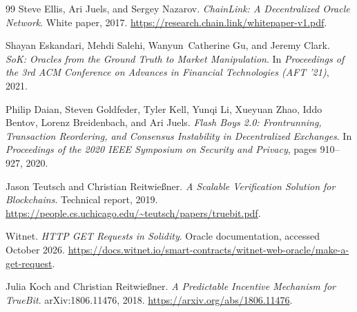 \documentclass[10pt]{article}
\begin{document}
\begin{thebibliography}{99}
Steve Ellis, Ari Juels, and Sergey Nazarov.
\newblock \emph{ChainLink: A Decentralized Oracle Network}.
\newblock White paper, 2017.
\newblock \url{https://research.chain.link/whitepaper-v1.pdf}.

Shayan Eskandari, Mehdi Salehi, Wanyun~Catherine Gu, and Jeremy Clark.
\newblock \emph{SoK: Oracles from the Ground Truth to Market Manipulation}.
\newblock In \emph{Proceedings of the 3rd ACM Conference on Advances in Financial Technologies (AFT '21)}, 2021.

Philip Daian, Steven Goldfeder, Tyler Kell, Yunqi Li, Xueyuan Zhao, Iddo Bentov, Lorenz Breidenbach, and Ari Juels.
\newblock \emph{Flash Boys 2.0: Frontrunning, Transaction Reordering, and Consensus Instability in Decentralized Exchanges}.
\newblock In \emph{Proceedings of the 2020 IEEE Symposium on Security and Privacy}, pages 910--927, 2020.

Jason Teutsch and Christian Reitwie{\ss}ner.
\newblock \emph{A Scalable Verification Solution for Blockchains}.
\newblock Technical report, 2019.
\newblock \url{https://people.cs.uchicago.edu/~teutsch/papers/truebit.pdf}.

Witnet.
\newblock \emph{HTTP GET Requests in Solidity}.
\newblock Oracle documentation, accessed October 2026.
\newblock \url{https://docs.witnet.io/smart-contracts/witnet-web-oracle/make-a-get-request}.

Julia Koch and Christian Reitwie\ss ner.
\newblock \emph{A Predictable Incentive Mechanism for TrueBit}.
\newblock arXiv:1806.11476, 2018.
\newblock \url{https://arxiv.org/abs/1806.11476}.

\end{thebibliography}
\end{document}
